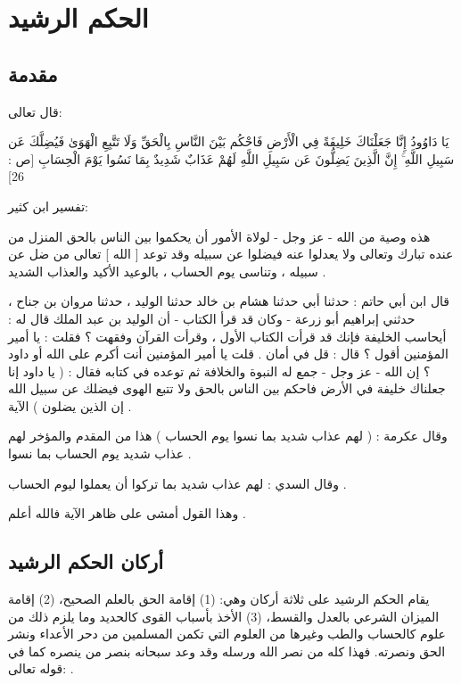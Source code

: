 
\chapter{الحكم الرشيد}

\section{مقدمة}


قال تعالى:


يَا دَاوُودُ إِنَّا جَعَلْنَاكَ خَلِيفَةً فِي الْأَرْضِ فَاحْكُم بَيْنَ النَّاسِ بِالْحَقِّ وَلَا تَتَّبِعِ الْهَوَىٰ فَيُضِلَّكَ عَن سَبِيلِ اللَّهِ ۚ إِنَّ الَّذِينَ يَضِلُّونَ عَن سَبِيلِ اللَّهِ لَهُمْ عَذَابٌ شَدِيدٌ بِمَا نَسُوا يَوْمَ الْحِسَابِ [ص : 26]


تفسير ابن كثير:

هذه وصية من الله - عز وجل - لولاة الأمور أن يحكموا بين الناس بالحق المنزل من عنده تبارك وتعالى ولا يعدلوا عنه فيضلوا عن سبيله وقد توعد [ الله ] تعالى من ضل عن سبيله ، وتناسى يوم الحساب ، بالوعيد الأكيد والعذاب الشديد .

قال ابن أبي حاتم : حدثنا أبي حدثنا هشام بن خالد حدثنا الوليد ، حدثنا مروان بن جناح ، حدثني إبراهيم أبو زرعة - وكان قد قرأ الكتاب - أن الوليد بن عبد الملك قال له : أيحاسب الخليفة فإنك قد قرأت الكتاب الأول ، وقرأت القرآن وفقهت ؟ فقلت : يا أمير المؤمنين أقول ؟ قال : قل في أمان . قلت يا أمير المؤمنين أنت أكرم على الله أو داود ؟ إن الله - عز وجل - جمع له النبوة والخلافة ثم توعده في كتابه فقال : ( يا داود إنا جعلناك خليفة في الأرض فاحكم بين الناس بالحق ولا تتبع الهوى فيضلك عن سبيل الله إن الذين يضلون ) الآية .

وقال عكرمة : ( لهم عذاب شديد بما نسوا يوم الحساب ) هذا من المقدم والمؤخر لهم عذاب شديد يوم الحساب بما نسوا .

وقال السدي : لهم عذاب شديد بما تركوا أن يعملوا ليوم الحساب .

وهذا القول أمشى على ظاهر الآية فالله أعلم .

\section{أركان الحكم الرشيد}

يقام الحكم الرشيد على ثلاثة أركان وهي: (1) إقامة الحق بالعلم الصحيح، (2) إقامة الميزان الشرعي بالعدل والقسط، (3) الأخذ بأسباب القوى كالحديد وما يلزم ذلك من علوم كالحساب والطب وغيرها من العلوم التي تكمن المسلمين من دحر الأعداء ونشر الحق ونصرته. فهذا كله من نصر الله ورسله وقد وعد سبحانه بنصر من ينصره كما في قوله تعالى:
\quranayah*[47][7]{\footnotesize \surahname*[47]}. 

